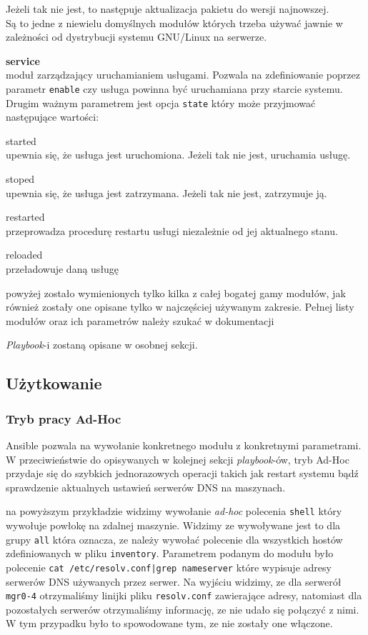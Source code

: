 \begin{description}
\begin{description}
				Jeżeli tak nie jest, to następuje aktualizacja pakietu do wersji najnowszej.\\
				Są to jedne z niewielu domyślnych modułów których trzeba używać jawnie w zależności od dystrybucji systemu GNU/Linux na serwerze.
		\end{description}
	\item{\textbf{service}}\\
		moduł zarządzający uruchamianiem usługami. Pozwala na zdefiniowanie poprzez parametr \texttt{enable} czy usługa powinna być uruchamiana przy starcie systemu.
		Drugim ważnym parametrem jest opcja \texttt{state} który może przyjmować następujące wartości:
		\begin{description}
			\item{started}\\
				upewnia się, że usługa jest uruchomiona. Jeżeli tak nie jest, uruchamia usługę.
			\item{stoped}\\
				upewnia się, że usługa jest zatrzymana. Jeżeli tak nie jest, zatrzymuje ją.
			\item{restarted}\\
				przeprowadza procedurę restartu usługi niezależnie od jej aktualnego stanu.
			\item{reloaded}\\
				przeładowuje daną usługę
		\end{description}
\end{description}
powyżej zostało wymienionych tylko kilka z całej bogatej gamy modułów, jak również zostały one opisane tylko w najczęściej używanym zakresie.
Pełnej listy modułów oraz ich parametrów należy szukać w dokumentacji

\textit{Playbook}-i zostaną opisane w osobnej sekcji.
\subsection{Użytkowanie}
\subsubsection{Tryb pracy Ad-Hoc}
Ansible pozwala na wywołanie konkretnego modułu z konkretnymi parametrami. W przeciwieństwie do opisywanych w kolejnej sekcji \textit{playbook}-ów, tryb Ad-Hoc przydaje się do szybkich jednorazowych operacji takich jak restart systemu bądź sprawdzenie aktualnych ustawień serwerów DNS na maszynach.

na powyższym przykładzie widzimy wywołanie \textit{ad-hoc} polecenia \texttt{shell} który wywołuje powłokę na zdalnej maszynie.
Widzimy ze wywoływane jest to dla grupy \texttt{all} która oznacza, ze należy wywołać polecenie dla wszystkich hostów zdefiniowanych w pliku \texttt{inventory}.
Parametrem podanym do modułu było polecenie \texttt{cat /etc/resolv.conf|grep nameserver} które wypisuje adresy serwerów DNS używanych przez serwer.
Na wyjściu widzimy, ze dla serwerół \texttt{mgr0-4} otrzymaliśmy linijki pliku \texttt{resolv.conf} zawierające adresy, natomiast dla pozostałych serwerów otrzymaliśmy informację, ze nie udało się połączyć z nimi.
W tym przypadku było to spowodowane tym, ze nie zostały one włączone.

